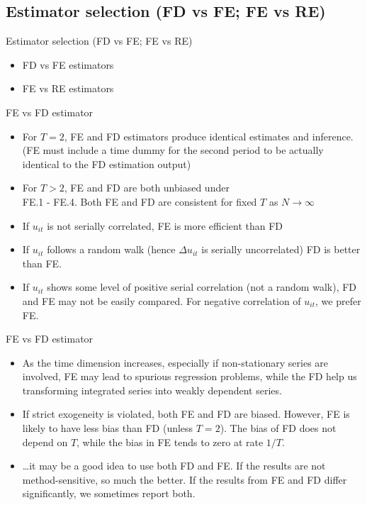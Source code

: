 \documentclass[usenames,dvipsnames]{beamer}
\begin{document}
\subsection*{Estimator selection (FD vs FE; FE vs RE)}
\begin{frame}{Estimator selection (FD vs FE; FE vs RE)}
\begin{itemize}
    \item FD vs FE estimators
    \bigskip
    \item FE vs RE estimators
\end{itemize}    
\end{frame}
\begin{frame}{FE vs FD estimator}
\begin{itemize}
\item For $T=2$, FE and FD estimators produce identical estimates and inference. (FE must include a time dummy for the second period to be actually identical to the FD estimation output)
\medskip
\item For $T>2$, FE and FD are both unbiased under \\FE.1 - FE.4. Both FE and FD are consistent for fixed $T$ as $N \rightarrow \infty$
\medskip
\item If $u_{it}$ is not serially correlated, FE is more efficient than FD
\medskip
\item If $u_{it}$ follows a random walk (hence $\Delta u_{it}$ is serially uncorrelated) FD is better than FE.
\medskip
\item If $u_{it}$ shows some level of positive serial correlation (not a random walk), FD and FE may not be easily compared. For negative correlation of $u_{it}$, we prefer FE.
\end{itemize}
\end{frame}
\begin{frame}{FE vs FD estimator}
\begin{itemize}
\item As the time dimension increases, especially if non-stationary series are involved, FE may lead to spurious regression problems, while the FD help us transforming integrated series into weakly dependent series.
\medskip
\item If strict exogeneity is violated, both FE and FD are biased. However, FE is likely to have less bias than FD (unless $T=2$). The bias of FD does not depend on $T$, while the bias in FE tends to zero at rate $1/T$.
\medskip
\item \dots it may be a good idea to use both FD and FE. If the results are not method-sensitive, so much the better. If the results from FE and FD differ significantly, we sometimes report both.
\end{itemize}
\end{frame}
\end{document}
